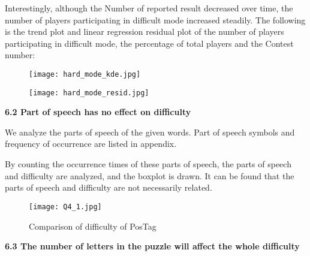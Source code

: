 \documentclass{mcmthesis}
\begin{document}
Interestingly, although the Number of reported result decreased over time, the number of players participating in difficult mode increased steadily. The following is the trend plot and linear regression residual plot of the number of players participating in difficult mode, the percentage of total players and the Contest number:
\begin{figure}[H]
	\subfigure
	{
		\begin{minipage}[b]{.28\linewidth}
			\centering
			\texttt{[image: hard\_mode\_kde.jpg]}
		\end{minipage}
	} \quad \quad \quad \quad \quad \quad \quad 
	\subfigure
	{
		\begin{minipage}[b]{.28\linewidth}
			\texttt{[image: hard\_mode\_resid.jpg]}
		\end{minipage}
	}
\end{figure}
 \noindent
\textbf{6.2 Part of speech has no effect on difficulty}

We analyze the parts of speech of the given words. Part of speech symbols and frequency of occurrence are listed in appendix.

By counting the occurrence times of these parts of speech, the parts of speech and difficulty are analyzed, and the boxplot is drawn. It can be found that the parts of speech and difficulty are not necessarily related.
\begin{figure}[H]
	\centering
	\texttt{[image: Q4\_1.jpg]}
	\caption{\small Comparison of difficulty of PosTag}
\end{figure}
 \noindent
\textbf{6.3 The number of letters in the puzzle will affect the whole difficulty}
\end{document}
